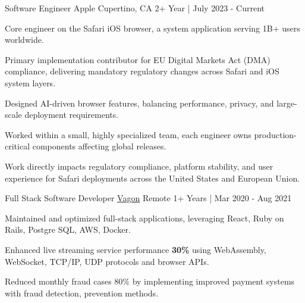 \begin{cventries}

  \cvopenentry
   {Software Engineer} %
    {Apple} %
    {Cupertino, CA} %
    {2+ Year | July 2023 - Current} %
    {
      \begin{cvitems} %
        \item {Core engineer on the Safari iOS browser, a system application serving 1B+ users worldwide.}
        \item {Primary implementation contributor for EU Digital Markets Act (DMA) compliance, delivering mandatory regulatory changes across Safari and iOS system layers.}
        \item {Designed AI-driven browser features, balancing performance, privacy, and large-scale deployment requirements.}
        \item {Worked within a small, highly specialized team, each engineer owns production-critical components affecting global releases.}
        \item {Work directly impacts regulatory compliance, platform stability, and user experience for Safari deployments across the United States and European Union.}
      \end{cvitems}
    }
  \cvopenentry
   {Full Stack Software Developer} %
    {\href{https://vagon.io}{Vagon}} %
    {Remote} %
    {1+ Years | Mar 2020 - Aug 2021} %
    {
      \begin{cvitems} %
       \item {Maintained and optimized full-stack applications, leveraging React, Ruby on Rails, Postgre SQL, AWS, Docker.}
		\item {Enhanced live streaming service performance \textbf{30\%} using WebAssembly, WebSocket, TCP/IP, UDP protocols and browser APIs.}
	\item {Reduced monthly fraud cases 80\% by implementing improved payment systems with fraud detection, prevention methods.}
      \end{cvitems}
    }


\end{cventries}
